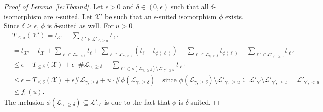 \documentclass[11pt]{article}
\begin{document}
\begin{proof}[Proof of Lemma~\ref{le:Tbound}]
  Let $\epsilon>0$ and $\delta\in(0,\epsilon)$ such that all $\delta$-isomorphism are $\epsilon$-suited. Let $\mathcal{X}'$ be such that an $\epsilon$-suited isomorphism $\phi$ exists. Since $\delta\geq \epsilon$, $\phi$ is $\delta$-suited as well.
  For $u>0$,
  \begin{align*}
&  T_{\leq u}(\mathcal{X}')=
  t_{\mathcal{X}'}-\sum_{\ell'\in \mathcal{L}'_{\gamma', \geq u}   } t_{\ell'}
  \\
  &= t_{\mathcal{X}'}- t_{\mathcal{X}}
  +\sum_{\ell \in \mathcal{L}_{\gamma,\leq \delta} } t_\ell+
  \sum_{\ell \in \mathcal{L}_{\gamma,\geq \delta} } (t_\ell-t_{\phi(\ell)})+
  \sum_{\ell \in \mathcal{L}_{\gamma,\geq \delta} } t_{\phi(\ell)}-\sum_{\ell'\in \mathcal{L}'_{\gamma', \geq u}   } t_{\ell'}\\
  &\leq \epsilon + T_{\leq\delta}(\mathcal{X})
  + \epsilon \cdot  \#  \mathcal{L}_{\gamma,\geq \delta} +
  \sum_{\ell' \in \phi(\mathcal{L}_{\gamma,\geq \delta})\setminus    \mathcal{L}'_{\gamma', \geq u}   } t_{\ell'}\\
  &\leq \epsilon+ T_{\leq\delta}(\mathcal{X})
  + \epsilon  \#  \mathcal{L}_{\gamma,\geq \delta} +
  u\cdot \#  \phi(\mathcal{L}_{\gamma,\geq \delta}) \quad \mbox{since $\phi(\mathcal{L}_{\gamma,\geq \delta})
  \setminus    \mathcal{L}'_{\gamma', \geq u}\subseteq \mathcal{L}'_{\gamma'}
  \setminus    \mathcal{L}'_{\gamma', \geq u}=  \mathcal{L}'_{\gamma',< u} $}
	\\&\leq f_\epsilon(u).
  \end{align*}
The inclusion    $\phi(\mathcal{L}_{\gamma,\geq \delta})\subseteq   \mathcal{L}'_{\gamma'} $ is due to the fact that $\phi$ is $\delta$-suited.
\end{proof}
\end{document}
